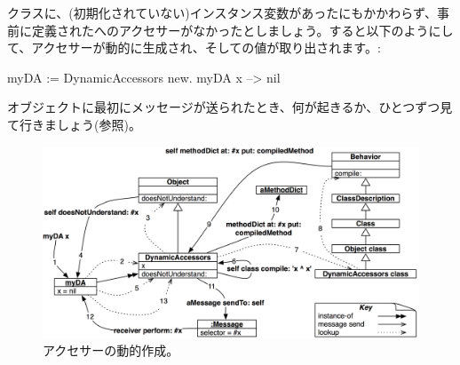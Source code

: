\documentclass[a4paper,10pt,twoside]{book}
\begin{document}
クラスに、(初期化されていない)インスタンス変数があったにもかかわらず、事前に定義されたへのアクセサーがなかったとしましょう。すると以下のようにして、アクセサーが動的に生成され、そしての値が取り出されます。:
\begin{code}{}
myDA := DynamicAccessors new.
myDA x --> nil
\end{code}

オブジェクトに最初にメッセージが送られたとき、何が起きるか、ひとつずつ見て行きましょう(参照)。

\begin{figure}[ht]\centering
	\includegraphics[width=\linewidth]{DynamicAccessors}
	\caption{アクセサーの動的作成。\figlabel{DynamicAccessors}}
\end{figure}
\end{document}
